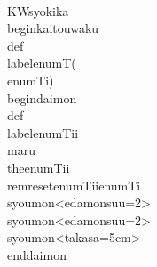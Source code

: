 \\KWsyokika
   \\begin{kaitouwaku}
    \\def\\labelenumT{(\\enumTi)}
    \\begin{daimon}
      \\def\\labelenumTii{\\maru{\\theenumTii}}
      \\remreset{enumTii}{enumTi}
      \\syoumon<edamonsuu=2>
      \\syoumon<edamonsuu=2>
      \\syoumon<takasa=5cm>
    \\end{daimon}
